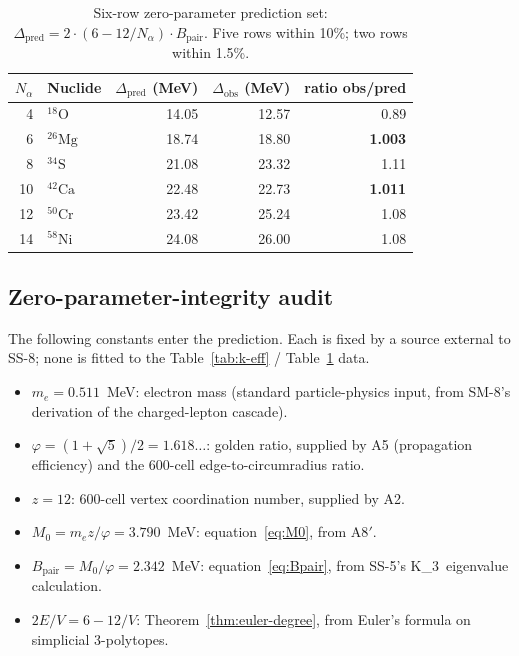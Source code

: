 \documentclass[11pt,letterpaper]{article}
\theoremstyle{definition}
\newcommand{\Mzero}{M_0}
\newcommand{\phig}{\varphi}
\newcommand{\Bpair}{B_{\text{pair}}}
\newcommand{\Nalpha}{N_\alpha}
\newcommand{\Kthree}{K_3}
\begin{document}
\begin{table}[h]
\centering
\caption{Six-row zero-parameter prediction set: $\Delta_{\text{pred}} = 2 \cdot (6 - 12/\Nalpha) \cdot \Bpair$. Five rows within 10\%; two rows within 1.5\%.}
\label{tab:delta-nuclide}
\begin{tabular}{@{}rlrrr@{}}
\toprule
$\Nalpha$ & Nuclide & $\Delta_{\text{pred}}$ (MeV) & $\Delta_{\text{obs}}$ (MeV) & ratio obs/pred \\
\midrule
4 & ${}^{18}\mathrm{O}$ & 14.05 & 12.57 & 0.89 \\
6 & ${}^{26}\mathrm{Mg}$ & 18.74 & 18.80 & \textbf{1.003} \\
8 & ${}^{34}\mathrm{S}$ & 21.08 & 23.32 & 1.11 \\
10 & ${}^{42}\mathrm{Ca}$ & 22.48 & 22.73 & \textbf{1.011} \\
12 & ${}^{50}\mathrm{Cr}$ & 23.42 & 25.24 & 1.08 \\
14 & ${}^{58}\mathrm{Ni}$ & 24.08 & 26.00 & 1.08 \\
\bottomrule
\end{tabular}
\end{table}

\subsection{Zero-parameter-integrity audit}
\label{sec:zero-param-audit}

The following constants enter the prediction. Each is fixed by a source external to SS-8; none is fitted to the Table~\ref{tab:k-eff} / Table~\ref{tab:delta-nuclide} data.

\begin{itemize}
  \item $m_e = 0.511$~MeV: electron mass (standard particle-physics input, from SM-8's derivation of the charged-lepton cascade).
  \item $\phig = (1 + \sqrt{5})/2 = 1.618\ldots$: golden ratio, supplied by A5 (propagation efficiency) and the 600-cell edge-to-circumradius ratio.
  \item $z = 12$: 600-cell vertex coordination number, supplied by A2.
  \item $\Mzero = m_e z / \phig = 3.790$~MeV: equation~\eqref{eq:M0}, from A8$'$.
  \item $\Bpair = \Mzero/\phig = 2.342$~MeV: equation~\eqref{eq:Bpair}, from SS-5's \Kthree\ eigenvalue calculation.
  \item $2E/V = 6 - 12/V$: Theorem~\ref{thm:euler-degree}, from Euler's formula on simplicial 3-polytopes.
\end{itemize}
\end{document}
